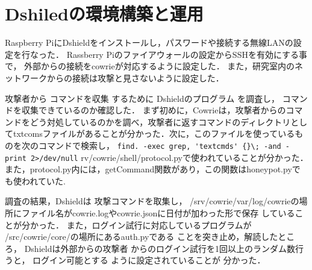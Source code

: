\documentclass[dvipdfmx]{bta}
\begin{document}
\chapter{Dshiledの環境構築と運用}

Raspberry PiにDshieldをインストールし，パスワードや接続する無線LANの設定を行なった．
Rassberry Piのファイアウォールの設定からSSHを有効にする事で，
外部からの接続をcowrieが対応するように設定した．
また，研究室内のネットワークからの接続は攻撃と見さないように設定した．


攻撃者から
コマンドを収集
するために
Dshieldのプログラム
を調査し，
コマンドを収集できているのか確認した．
まず初めに，Cowrieは，攻撃者からのコマンドをどう対処しているのかを調べ，攻撃者に返すコマンドのディレクトリとしてtxtcomsファイルがあることが分かった．次に，このファイルを使っているものを次のコマンドで検索し，
\verb!find. -exec grep, 'textcmds' {}\; -and -print 2>/dev/null!
rv/cowrie/shell/protocol.pyで使われていることが分かった．また，protocol.py内には，getCommand関数があり，この関数はhoneypot.pyでも使われていた.

調査の結果，Dshieldは
攻撃コマンドを取集し，
/srv/cowrie/var/log/cowrieの場所にファイル名がcowrie.logやcowrie.jsonに日付が加わった形で保存
していることが分かった．
また，ログイン試行に対応しているプログラムが
/src/cowrie/core/の場所にあるauth.pyである
ことを突き止め，解読したところ，
Dshieldは外部からの攻撃者
からのログイン試行を1回以上のランダム数行うと，
ログイン可能とする
ように設定されていることが
分かった．

\end{document}
